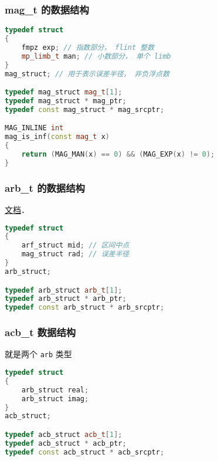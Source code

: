 \subsubsection{mag\_t 的数据结构}
\begin{lstlisting}[language=cpp]
typedef struct
{
    fmpz exp; // 指数部分， flint 整数
    mp_limb_t man; // 小数部分， 单个 limb
}
mag_struct; // 用于表示误差半径， 非负浮点数

typedef mag_struct mag_t[1];
typedef mag_struct * mag_ptr;
typedef const mag_struct * mag_srcptr;

MAG_INLINE int
mag_is_inf(const mag_t x)
{
    return (MAG_MAN(x) == 0) && (MAG_EXP(x) != 0);
}
\end{lstlisting}

\subsubsection{arb\_t 的数据结构}
\href{https://arblib.org/arb.html}{文档}．

\begin{lstlisting}[language=cpp]
typedef struct
{
    arf_struct mid; // 区间中点
    mag_struct rad; // 误差半径
}
arb_struct;

typedef arb_struct arb_t[1];
typedef arb_struct * arb_ptr;
typedef const arb_struct * arb_srcptr;
\end{lstlisting}

\subsubsection{acb\_t 数据结构}
就是两个 \verb|arb| 类型
\begin{lstlisting}[language=cpp]
typedef struct
{
    arb_struct real;
    arb_struct imag;
}
acb_struct;

typedef acb_struct acb_t[1];
typedef acb_struct * acb_ptr;
typedef const acb_struct * acb_srcptr;
\end{lstlisting}
